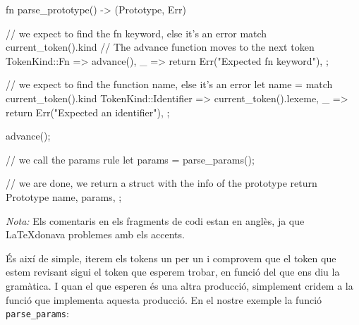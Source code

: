 ﻿\documentclass{article}
\begin{document}
\begin{code}
fn parse_prototype() -> (Prototype, Err) {
    // we expect to find the fn keyword, else it's an error
    match current_token().kind {
        // The advance function moves to the next token
        TokenKind::Fn => advance(),
        _ => return Err("Expected fn keyword"),
    };

    // we expect to find the function name, else it's an error
    let name = match current_token().kind {
        TokenKind::Identifier => current_token().lexeme,
        _ => return Err("Expected an identifier"),
    };

    advance();

    // we call the params rule
    let params = parse_params();

    // we are done, we return a struct with the info of the prototype
    return Prototype { 
        name,
        params,
    };
}
\end{code}

\textit{Nota:} Els comentaris en els fragments de codi estan en anglès, ja que
\LaTeX donava problemes amb els accents.

És així de simple, iterem els tokens un per un i comprovem que el token que
estem revisant sigui el token que esperem trobar, en funció del que ens diu la
gramàtica. I quan el que esperen és una altra producció, simplement cridem a la
funció que implementa aquesta producció. En el nostre exemple la funció
\texttt{parse\_params}:
\end{document}
